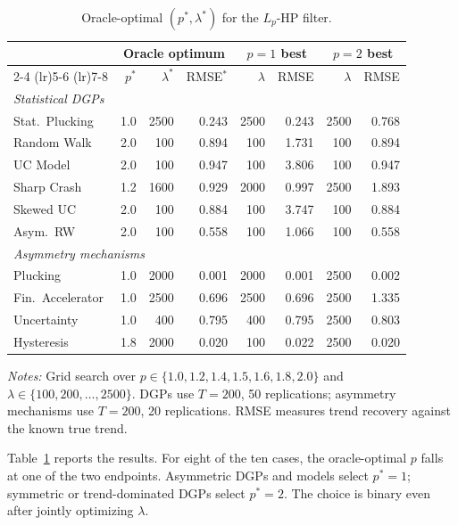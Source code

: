\documentclass[10pt]{article}
\begin{document}
\begin{table}[htbp]
\centering
\caption{Oracle-optimal $(p^*, \lambda^*)$ for the $L_p$-HP filter.}
\label{tab:lp_results}
\begin{tabular}{l rr r rr rr}
\toprule
& \multicolumn{3}{c}{Oracle optimum} & \multicolumn{2}{c}{$p = 1$ best} & \multicolumn{2}{c}{$p = 2$ best} \\
\cmidrule(lr){2-4} \cmidrule(lr){5-6} \cmidrule(lr){7-8}
& $p^*$ & $\lambda^*$ & RMSE$^*$ & $\lambda$ & RMSE & $\lambda$ & RMSE \\
\midrule
\multicolumn{8}{l}{\textit{Statistical DGPs}} \\
Stat.\ Plucking  & 1.0 & 2500 & 0.243 & 2500 & 0.243 & 2500 & 0.768 \\
Random Walk      & 2.0 & 100  & 0.894 & 100  & 1.731 & 100  & 0.894 \\
UC Model         & 2.0 & 100  & 0.947 & 100  & 3.806 & 100  & 0.947 \\
Sharp Crash      & 1.2 & 1600 & 0.929 & 2000 & 0.997 & 2500 & 1.893 \\
Skewed UC        & 2.0 & 100  & 0.884 & 100  & 3.747 & 100  & 0.884 \\
Asym.\ RW        & 2.0 & 100  & 0.558 & 100  & 1.066 & 100  & 0.558 \\
\midrule
\multicolumn{8}{l}{\textit{Asymmetry mechanisms}} \\
Plucking         & 1.0 & 2000 & 0.001 & 2000 & 0.001 & 2500 & 0.002 \\
Fin.\ Accelerator & 1.0 & 2500 & 0.696 & 2500 & 0.696 & 2500 & 1.335 \\
Uncertainty      & 1.0 & 400  & 0.795 & 400  & 0.795 & 2500 & 0.803 \\
Hysteresis       & 1.8 & 2000 & 0.020 & 100  & 0.022 & 2500 & 0.020 \\
\bottomrule
\end{tabular}
\begin{tablenotes}
\small
\item \textit{Notes:} Grid search over $p \in \{1.0, 1.2, 1.4, 1.5, 1.6, 1.8, 2.0\}$ and $\lambda \in \{100, 200, \ldots, 2500\}$. DGPs use $T = 200$, 50 replications; asymmetry mechanisms use $T = 200$, 20 replications. RMSE measures trend recovery against the known true trend.
\end{tablenotes}
\end{table}

Table~\ref{tab:lp_results} reports the results. For eight of the ten cases, the oracle-optimal $p$ falls at one of the two endpoints. Asymmetric DGPs and models select $p^* = 1$; symmetric or trend-dominated DGPs select $p^* = 2$. The choice is binary even after jointly optimizing $\lambda$.
\end{document}
